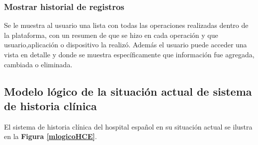 {\subsubsection{Mostrar historial de registros}
Se le muestra al usuario una lista con todas las operaciones realizadas dentro de la plataforma, con un resumen de que se hizo en cada operación y que usuario,aplicación o dispositivo la realizó. Además el usuario puede acceder una vista en detalle y donde se muestra específicamente que información fue agregada, cambiada o eliminada.
}

\subsection{Modelo lógico de la situación actual de sistema de historia clínica}
El sistema de historia clínica del hospital español en su situación actual se ilustra en la \textbf{Figura \ref{mlogicoHCE}}.


